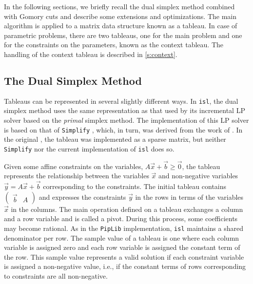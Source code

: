 In the following sections, we briefly recall the dual simplex
method combined with Gomory cuts and describe some extensions
and optimizations.  The main algorithm is applied to a matrix
data structure known as a tableau.  In case of parametric problems,
there are two tableaus, one for the main problem and one for
the constraints on the parameters, known as the context tableau.
The handling of the context tableau is described in \autoref{s:context}.

\subsection{The Dual Simplex Method}

Tableaus can be represented in several slightly different ways.
In {\tt isl}, the dual simplex method uses the same representation
as that used by its incremental LP solver based on the \emph{primal}
simplex method.  The implementation of this LP solver is based
on that of {\tt Simplify} \parencite{Detlefs2005simplify}, which, in turn,
was derived from the work of \textcite{Nelson1980phd}.
In the original \parencite{Nelson1980phd}, the tableau was implemented
as a sparse matrix, but neither {\tt Simplify} nor the current
implementation of {\tt isl} does so.

Given some affine constraints on the variables,
$A \vec x + \vec b \ge \vec 0$, the tableau represents the relationship
between the variables $\vec x$ and non-negative variables
$\vec y = A \vec x + \vec b$ corresponding to the constraints.
The initial tableau contains $\begin{pmatrix}
\vec b & A
\end{pmatrix}$ and expresses the constraints $\vec y$ in the rows in terms
of the variables $\vec x$ in the columns.  The main operation defined
on a tableau exchanges a column and a row variable and is called a pivot.
During this process, some coefficients may become rational.
As in the \texttt{PipLib} implementation,
{\tt isl} maintains a shared denominator per row.
The sample value of a tableau is one where each column variable is assigned
zero and each row variable is assigned the constant term of the row.
This sample value represents a valid solution if each constraint variable
is assigned a non-negative value, i.e., if the constant terms of
rows corresponding to constraints are all non-negative.

